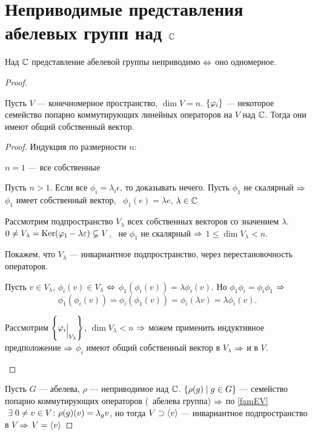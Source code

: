 \section{Неприводимые представления абелевых групп над $\mathbb{C}$}
\begin{theorem}
	Над $\mathbb{C}$ представление абелевой группы неприводимо $\Leftrightarrow$
	оно одномерное.
\end{theorem}
\begin{proof}
	\begin{theorem}\label{famEV}
		Пусть $V$ --- конечномерное пространство, $\dim V = n$.
		$\left\{\varphi_i\right\}$ --- некоторое семейство попарно коммутирующих линейных
		операторов на $V$ над $\mathbb{C}$.
		Тогда они имеют общий собственный вектор.
	\end{theorem}
	\begin{proof}
		Индукция по размерности $n$:
		\begin{points}{-3}
			\item $n = 1$ --- все собственные
			\item Пусть $n > 1$. Если все $\phi_i = \lambda_i \epsilon$, то доказывать нечего.
				Пусть $\phi_1$ не скалярный $\Rightarrow$
				$\phi_1$ имеет собственный вектор, \ie\
				$\phi_1(e) = \lambda e$, $\lambda \in \mathbb{C}$

				Рассмотрим подпространство $V_{\lambda}$ всех собственных векторов
					со значением $\lambda$.
				$0 \ne V_{\lambda} = \operatorname{Ker} (\varphi_1 - \lambda \varepsilon) \varsubsetneq V$, \bt\
				не $\phi_1$ не скалярный $\Rightarrow$ $1 \le \dim V_{\lambda} < n$.

				Покажем, что $V_{\lambda}$ --- инвариантное подпространство, через перестановочность операторов.

				Пусть $v \in V_{\lambda}$, $\phi_i(v) \in V_{\lambda}$ $\Leftrightarrow$
				$\phi_1(\phi_i(v)) = \lambda \phi_i(v)$.
				Но $\phi_1 \phi_i = \phi_i \phi_1$ $\Rightarrow$
				$$
					\phi_1(\phi_i(v)) = \phi_i(\phi_1(v)) = 
					\phi_i(\lambda v ) = \lambda \phi_i(v).
				$$

				Рассмотрим $\hc{\phi_i\evn{V_{\lambda}}}$, $\dim V_{\lambda} < n$ $\Rightarrow$
				можем применить индуктивное предположение $\Rightarrow$
				$\phi_i$ имеют общий собственный вектор в $V_{\lambda}$ $\Rightarrow$ и в $V$.
		\end{points}
	\end{proof}

	Пусть $G$ --- абелева, $\rho$ --- неприводимое над $\mathbb{C}$.
	$\left\{\rho(g) \mid g \in G\right\}$ --- семейство попарно коммутирующих операторов (\bt\ абелева группа) $\Rightarrow$
	по \autoref{famEV} $~\exists\; 0 \ne v \in V \colon \rho(g)(v) = \lambda_g v$,
	но тогда $V \supset \left\langle v\right\rangle$ --- инвариантное подпространство в $V$ $\Rightarrow$ $V = \left\langle v\right\rangle$
\end{proof}

